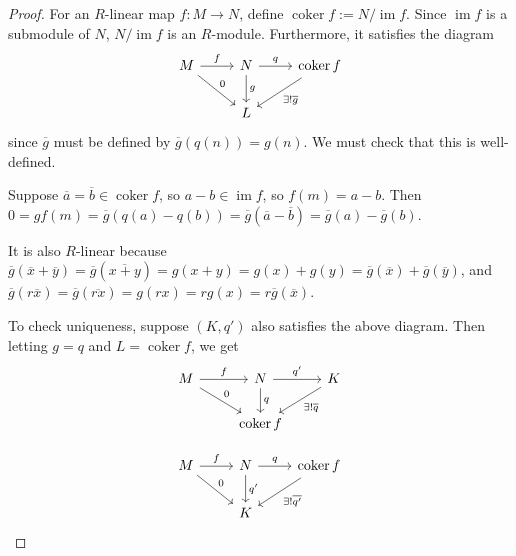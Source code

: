 \documentclass[reqno]{amsart}
\theoremstyle{definition}
\theoremstyle{remark}
\DeclareMathOperator{\im}{im}
\DeclareMathOperator{\coker}{coker}
\begin{document}
    \begin{proof}
        For an $R$-linear map $f \colon M \to N$, define
        $\coker f := N / \im f$. 
        Since $\im f$ is a submodule of $N$,
        $N / \im f$ is an $R$-module. Furthermore, it
        satisfies the diagram
        \begin{equation*}
        \begin{tikzcd}
            M \ar[r, "f"] \ar[dr,"0"] & N \ar[r, "q"] 
            \ar[d, "g"] & \coker f \ar[dl, "\exists ! \overline{g}"]\\
                          & L &
        \end{tikzcd}
        \end{equation*}
        since $\overline{g}$ must be defined by
        $\overline{g}(q(n)) = g(n)$.
        We must check that this is well-defined.

        Suppose $\overline{a} = \overline{b} \in 
        \coker f$, so $a-b \in \im f$, so
        $f(m) = a-b$. Then
        $0 = g f (m) = \overline{g} (q(a)- q(b))
        = \overline{g}\left( \overline{a}-
        \overline{b} \right) 
        = \overline{g}(a) - \overline{g}(b)$.

        It is also $R$-linear because
        $\overline{g}\left( \overline{x}+ \overline{y} \right) 
        = \overline{g}\left( \overline{x+y} \right) 
        = g(x+y) = g(x) + g(y) = 
        \overline{g}\left( \overline{x} \right) +
        \overline{g}\left( \overline{y} \right) $, and
        $\overline{g}\left( r \overline{x} \right) 
        = \overline{g}\left( \overline{rx} \right) 
        = g\left( rx \right) 
        = r g(x) = r \overline{g}(\overline{x})$.

        To check uniqueness, suppose
        $(K,q')$ also satisfies the above diagram. Then
        letting $g = q$ and $L = \coker f$, we get
        \begin{equation*}
        \begin{tikzcd}
            M \ar[r, "f"] \ar[dr, "0"] & N \ar[r, "q'"]
            \ar[d, "q"]& K \ar[dl, 
            "\exists ! \overline{q}"] \\
                          & \coker f &
        \end{tikzcd}
        \end{equation*}

        \begin{equation*}
        \begin{tikzcd}
            M \ar[r, "f"] \ar[dr, "0"] & N \ar[r, "q"]
            \ar[d, "q'"]& \coker f \ar[dl, 
            "\exists ! \overline{q'}"] \\
                          & K &
        \end{tikzcd}
        \end{equation*}



\end{proof}
\end{document}
